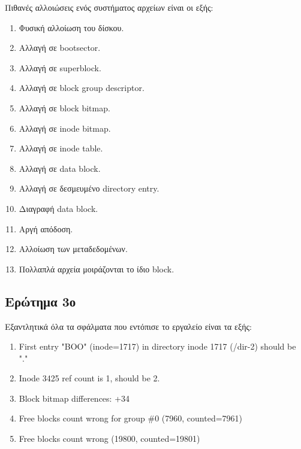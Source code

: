 \documentclass{article}
\begin{document}
\begin{enumerate}
Πιθανές αλλοιώσεις ενός συστήματος αρχείων είναι οι εξής:
\begin{enumerate}
    \item{Φυσική αλλοίωση του δίσκου.}
    \item{Αλλαγή σε bootsector.}
    \item{Αλλαγή σε superblock.}
    \item{Αλλαγή σε block group descriptor.}
    \item{Αλλαγή σε block bitmap.}
    \item{Αλλαγή σε inode bitmap.}
    \item{Αλλαγή σε inode table.}
    \item{Αλλαγή σε data block.}
    \item{Αλλαγή σε δεσμευμένο directory entry.}
    \item{Διαγραφή data block.}
    \item{Αργή απόδοση.}
    \item{Αλλοίωση των μεταδεδομένων.}
    \item{Πολλαπλά αρχεία μοιράζονται το ίδιο block.}
\end{enumerate}

\subsection{Ερώτημα 3ο}
Εξαντλητικά όλα τα σφάλματα που εντόπισε το εργαλείο είναι τα εξής:
\begin{enumerate}
    \item{First entry "BOO" (inode=1717) in directory inode 1717 (/dir-2) should be "."}
    \item{Inode 3425 ref count is 1, should be 2.}
    \item{Block bitmap differences: +34}
    \item{Free blocks count wrong for group \#0 (7960, counted=7961)}
    \item{Free blocks count wrong (19800, counted=19801)}
\end{enumerate}


\end{enumerate}
\end{document}
